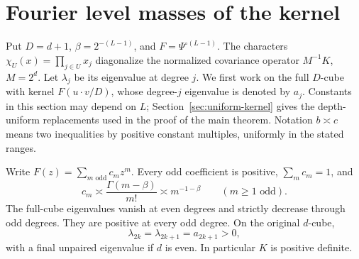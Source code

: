 \section{Fourier level masses of the kernel}\label{app:spectrum}
Put $D=d+1$, $\beta=2^{-(L-1)}$, and $F=\Psi^{\circ(L-1)}$.
The characters $\chi_U(x)=\prod_{j\in U}x_j$ diagonalize the
normalized covariance operator $M^{-1}K$, $M=2^d$. Let $\lambda_j$
be its eigenvalue at degree $j$. We first work on the full $D$-cube
with kernel $F(u\cdot v/D)$, whose degree-$j$ eigenvalue is denoted
by $a_j$. Constants in this section may depend on $L$;
Section~\ref{sec:uniform-kernel} gives the depth-uniform replacements used
in the proof of the main theorem.
Notation $b\asymp c$ means two inequalities by positive constant
multiples, uniformly in the stated ranges.

\begin{lemma}\label{lem:power}
Write $F(z)=\sum_{m\text{ odd}}c_mz^m$. Every odd coefficient is
positive, $\sum_m c_m=1$, and
\[
 c_m\asymp\frac{\Gamma(m-\beta)}{m!}\asymp m^{-1-\beta}
 \qquad(m\ge1\text{ odd}).
\]
The full-cube eigenvalues vanish at even degrees and strictly decrease
through odd degrees. They are positive at every odd degree. On the
original $d$-cube,
\[
 \lambda_{2k}=\lambda_{2k+1}=a_{2k+1}>0,
\]
with a final unpaired eigenvalue if $d$ is even. In particular $K$
is positive definite.
\end{lemma}
